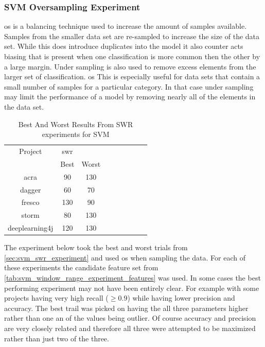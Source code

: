 \subsubsection{SVM Oversampling Experiment}
\label{sec:svm_os_experiment}

\gls{os} is a balancing technique used to increase the amount of samples available. Samples from the smaller data set are re-sampled to increase the size of the data set. While this does introduce duplicates into the model it also counter acts biasing that is present when one classification is more common then the other by a large margin. Under sampling is also used to remove excess elements from the larger set of classification. \gls{os} This is especially useful for data sets that contain a small number of samples for a particular category. In that case under sampling may limit the performance of a model by removing nearly all of the elements in the data set.

\begin{table}[ht]
\begin{center}

    \begin{tabular}{|c|c|c|c|c|c|c|c|c|}
        \hline
        Project & \multicolumn{1}{c}{\gls{swr}} & \\
         & \multicolumn{1}{c}{Best} & \multicolumn{1}{c|}{Worst} \\
         \hline
        acra & 90 & 130 \\
        dagger & 60 & 70 \\
        fresco & 130 & 90 \\
        storm & 80 & 130 \\
        deeplearning4j & 120 & 130 \\ \hline
    \end{tabular}
    \caption{Best And Worst Results From SWR experiments for SVM}
    \label{tab:svm_best_worst_swr_experiment_sets}
\end{center}
\end{table}

The experiment below took the best and worst trials from \autoref{sec:svm_swr_experiment} and used \gls{os} when sampling the data. For each of these experiments the candidate feature set from \autoref{tab:svm_window_range_experiment_features} was used. In some cases the best performing experiment may not have been entirely clear. For example with some projects having very high recall ($ \geq 0.9$) while having lower precision and accuracy. The best trail was picked on having the all three parameters higher rather than one an of the values being outlier. Of course accuracy and precision are very closely related and therefore all three were attempted to be maximized rather than just two of the three.

